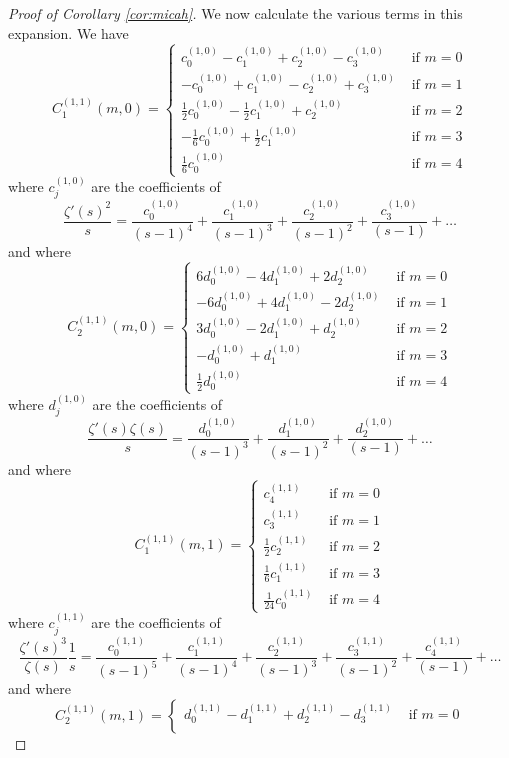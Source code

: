 \documentclass[12pt, a4paper,reqno]{amsart}
\theoremstyle{definition}
\numberwithin{equation}{section}
\begin{document}
\begin{proof}[Proof of Corollary \ref{cor:micah}]
We now calculate the various terms in this expansion. We have
\[
C_1^{(1,1)}(m,0) = 
\begin{cases}
     c^{(1,0)}_0-c^{(1,0)}_1+c^{(1,0)}_2-c^{(1,0)}_3 & \text{ if } m=0 \\[1.5ex]
    -c^{(1,0)}_0+c^{(1,0)}_1-c^{(1,0)}_2+c^{(1,0)}_3 & \text{ if } m=1 \\[1.5ex]
   \frac{1}{2} c^{(1,0)}_0- \frac{1}{2}  c^{(1,0)}_1 +c^{(1,0)}_2 & \text{ if } m=2 \\[1.5ex]
    -\frac{1}{6} c^{(1,0)}_0 +\frac{1}{2} c^{(1,0)}_1 & \text{ if } m=3\\[1.5ex]
    \frac{1}{6} c^{(1,0)}_0 & \text{ if } m=4
\end{cases}
\]
where $c^{(1,0)}_j$ are the coefficients of
\[
\frac{\zeta'(s)^2}{s} = \frac{c^{(1,0)}_0}{(s-1)^4} + \frac{c^{(1,0)}_1}{(s-1)^3} + \frac{c^{(1,0)}_2}{(s-1)^2} + \frac{c^{(1,0)}_3}{(s-1)} + \dots
\]
and where
\[
C_2^{(1,1)}(m,0) = 
\begin{cases}
6 d^{(1,0)}_0 -4 d^{(1,0)}_1 + 2d^{(1,0)}_2 & \text{ if } m=0 \\[1.5ex]
-6 d^{(1,0)}_0 + 4d^{(1,0)}_1 - 2d^{(1,0)}_2 & \text{ if } m=1 \\[1.5ex]
3 d^{(1,0)}_0 -2d^{(1,0)}_1 +d^{(1,0)}_2& \text{ if } m=2 \\[1.5ex]
-d^{(1,0)}_0 + d^{(1,0)}_1& \text{ if } m=3\\[1.5ex]
\frac{1}{2} d^{(1,0)}_0 & \text{ if } m=4
\end{cases}
\]
where $d^{(1,0)}_j$ are the coefficients of
\[
\frac{\zeta'(s) \zeta(s)}{s} = \frac{d^{(1,0)}_0}{(s-1)^3} + \frac{d^{(1,0)}_1}{(s-1)^2} + \frac{d^{(1,0)}_2}{(s-1)} + \dots
\]
and where
\[
C_1^{(1,1)}(m,1) = 
\begin{cases}
c^{(1,1)}_4 & \text{ if } m=0 \\[1.5ex]
c^{(1,1)}_3 & \text{ if } m=1 \\[1.5ex]
\frac{1}{2} c^{(1,1)}_2 & \text{ if } m=2 \\[1.5ex]
\frac{1}{6} c^{(1,1)}_1 & \text{ if } m=3\\[1.5ex]
\frac{1}{24} c^{(1,1)}_0 & \text{ if } m=4
\end{cases}
\]
where $c^{(1,1)}_j$ are the coefficients of
\[
\frac{\zeta'(s)^3}{\zeta(s)} \frac{1}{ s} = \frac{c^{(1,1)}_0}{(s-1)^5} + \frac{c^{(1,1)}_1}{(s-1)^4} + \frac{c^{(1,1)}_2}{(s-1)^3} + \frac{c^{(1,1)}_3}{(s-1)^2} + \frac{c^{(1,1)}_4}{(s-1)} + \dots
\]
and where
\[
C_2^{(1,1)}(m,1) = 
\begin{cases}
d^{(1,1)}_0 -d^{(1,1)}_1 +d^{(1,1)}_2 -d^{(1,1)}_3  & \text{ if } m=0 \\[1.5ex]

\end{cases}\]
\end{proof}
\end{document}
